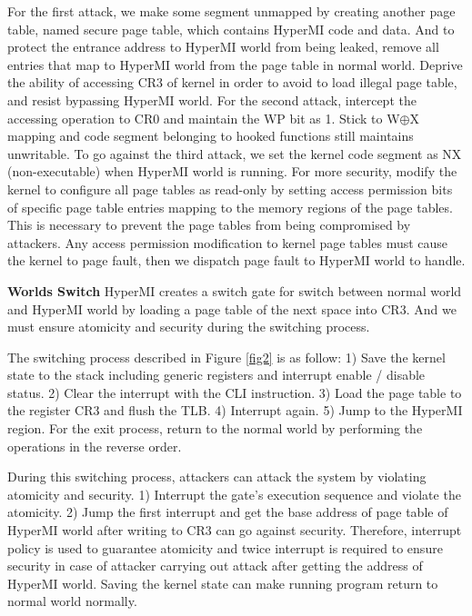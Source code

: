 \documentclass[conference]{IEEEtran}
\begin{document}
For the first attack, we make some segment unmapped by creating another page table, named secure page table, which contains HyperMI code and data. And to protect the entrance address to HyperMI world from being leaked,
remove all entries that map to HyperMI world from the page table in normal world. Deprive the ability of accessing CR3 of kernel in order to avoid to load illegal page table, and resist bypassing HyperMI world.
For the second attack, intercept the accessing operation to CR0 and maintain the WP bit as 1. Stick to W$\oplus${X} mapping and code segment belonging to hooked functions still maintains unwritable.
To go against the third attack, we set the kernel code segment as NX (non-executable) when HyperMI world is running. For more security, modify the kernel to configure all page tables as read-only by setting access permission bits of specific page table entries mapping to the memory regions of the page tables. This is necessary to prevent the page tables from being compromised by attackers. Any access permission modification to kernel page tables must cause the kernel to page fault, then we dispatch page fault to HyperMI world to handle.

\textbf{Worlds Switch}
HyperMI creates a switch gate for switch between normal world and HyperMI world by loading a page table of the next space into CR3. And we must ensure atomicity and security during the switching process.

The switching process described in Figure \ref{fig2} is as follow: 1) Save the kernel state to the stack including generic registers and interrupt enable / disable status. 2) Clear the interrupt with the CLI instruction. 3) Load the page table to the register CR3 and flush the TLB. 4) Interrupt again. 5) Jump to the HyperMI region. For the exit process, return to the normal world by performing the operations in the reverse order.

During this switching process, attackers can attack the system by violating atomicity and security. 1) Interrupt the gate's execution sequence and violate the atomicity. 2) Jump the first interrupt and get the base address of page table of HyperMI world after writing to CR3 can go against security. Therefore, interrupt policy is used to guarantee atomicity and twice interrupt is required to ensure security in case of attacker carrying out attack after getting the address of HyperMI world. Saving the kernel state can make running program return to normal world normally. 
\end{document}
